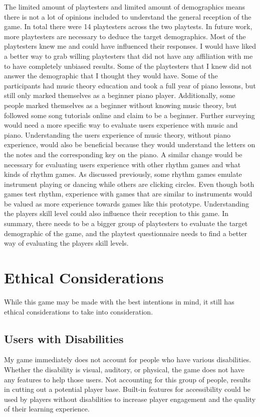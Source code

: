\documentclass[10pt,twocolumn]{article}
\begin{document}
The limited amount of playtesters and limited amount of demographics means there is not a lot of opinions included to understand the general reception of the game. In total there were 14 playtesters across the two playtests. In future work, more playtesters are necessary to deduce the target demographics. Most of the playtesters knew me and could have influenced their responses. I would have liked a better way to grab willing playtesters that did not have any affiliation with me to have completely unbiased results. Some of the playtesters that I knew did not answer the demographic that I thought they would have. Some of the participants had music theory education and took a full year of piano lessons, but still only marked themselves as a beginner piano player. Additionally, some people marked themselves as a beginner without knowing music theory, but followed some song tutorials online and claim to be a beginner. Further surveying would need a more specific way to evaluate users experience with music and piano. Understanding the users experience of music theory, without piano experience, would also be beneficial because they would understand the letters on the notes and the corresponding key on the piano. A similar change would be necessary for evaluating users experience with other rhythm games and what kinds of rhythm games. As discussed previously, some rhythm games emulate instrument playing or dancing while others are clicking circles. Even though both games test rhythm, experience with games that are similar to instruments would be valued as more experience towards games like this prototype. Understanding the players skill level could also influence their reception to this game. In summary, there needs to be a bigger group of playtesters to evaluate the target demographic of the game, and the playtest questionnaire needs to find a better way of evaluating the players skill levels.

\section{Ethical Considerations}
While this game may be made with the best intentions in mind, it still has ethical considerations to take into consideration. 

\subsection{Users with Disabilities}
My game immediately does not account for people who have various disabilities. Whether the disability is visual, auditory, or physical, the game does not have any features to help those users. Not accounting for this group of people, results in cutting out a potential player base. Built-in features for accessibility could be used by players without disabilities to increase player engagement and the quality of their learning experience. 
\end{document}
